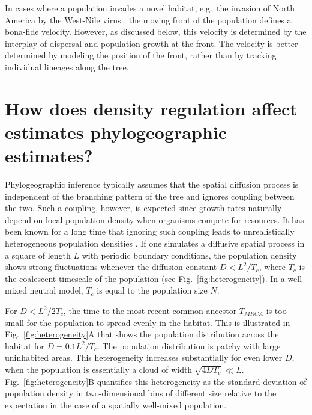 \documentclass[aps,rmp, twocolumn]{revtex4}
\begin{document}
In cases where a population invades a novel habitat, e.g.~the invasion of North America by the West-Nile virus \citep{pybus_unified_2010}, the moving front of the population defines a bona-fide velocity.
However, as discussed below, this velocity is determined by the interplay of dispersal and population growth at the front.
The velocity is better determined by modeling the position of the front, rather than by tracking individual lineages along the tree.


\section*{How does density regulation affect estimates phylogeographic estimates?}
Phylogeographic inference typically assumes that the spatial diffusion process is independent of the branching pattern of the tree and ignores coupling between the two.
Such a coupling, however, is expected since growth rates naturally depend on local population density when organisms compete for resources.
It has been known for a long time that ignoring such coupling leads to unrealistically heterogeneous population densities \citep{felsenstein_pain_1975}.
If one simulates a diffusive spatial process in a square of length $L$ with periodic boundary conditions, the population density shows strong fluctuations whenever the diffusion constant $D<L^2/T_c$, where $T_c$ is the coalescent timescale of the population (see Fig.~\ref{fig:heterogeneity}).
In a well-mixed neutral model, $T_c$ is equal to the population size $N$.

For $D<L^2/2T_c$, the time to the most recent common ancestor $T_{MRCA}$ is too small for the population to spread evenly in the habitat.
This is illustrated in Fig.~\ref{fig:heterogeneity}A that shows the population distribution across the habitat for $D=0.1L^2/T_c$.
The population distribution is patchy with large uninhabited areas.
This heterogeneity increases substantially for even lower $D$, when the population is essentially a cloud of width $\sqrt{4DT_c}\ll L$.
Fig.~\ref{fig:heterogeneity}B quantifies this heterogeneity as the standard deviation of population density in two-dimensional bins of different size  relative to the expectation in the case of a spatially well-mixed population.
\end{document}
